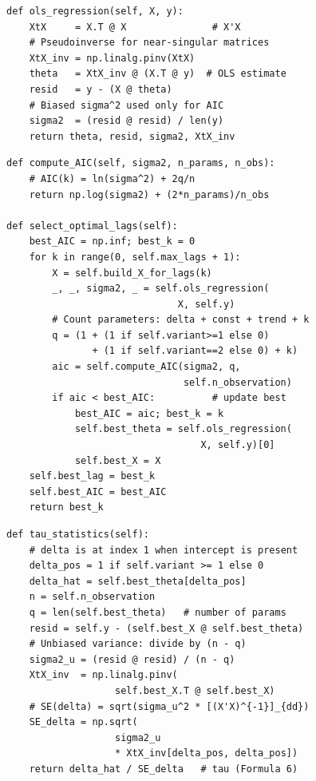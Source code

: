 \documentclass[10pt,a4paper,twocolumn]{article}
\begin{document}
\begin{tcolorbox}[codebox={Step 4 --- \texttt{ols\_regression()} (Formula 4)}]
\begin{lstlisting}[style=pythonplain]
def ols_regression(self, X, y):
    XtX     = X.T @ X               # X'X
    # Pseudoinverse for near-singular matrices
    XtX_inv = np.linalg.pinv(XtX)
    theta   = XtX_inv @ (X.T @ y)  # OLS estimate
    resid   = y - (X @ theta)
    # Biased sigma^2 used only for AIC
    sigma2  = (resid @ resid) / len(y)
    return theta, resid, sigma2, XtX_inv
\end{lstlisting}
\end{tcolorbox}

\begin{tcolorbox}[codebox={Step 5 --- AIC lag selection (Formula 5)}]
\begin{lstlisting}[style=pythonplain]
def compute_AIC(self, sigma2, n_params, n_obs):
    # AIC(k) = ln(sigma^2) + 2q/n
    return np.log(sigma2) + (2*n_params)/n_obs

def select_optimal_lags(self):
    best_AIC = np.inf; best_k = 0
    for k in range(0, self.max_lags + 1):
        X = self.build_X_for_lags(k)
        _, _, sigma2, _ = self.ols_regression(
                              X, self.y)
        # Count parameters: delta + const + trend + k
        q = (1 + (1 if self.variant>=1 else 0)
               + (1 if self.variant==2 else 0) + k)
        aic = self.compute_AIC(sigma2, q,
                               self.n_observation)
        if aic < best_AIC:          # update best
            best_AIC = aic; best_k = k
            self.best_theta = self.ols_regression(
                                  X, self.y)[0]
            self.best_X = X
    self.best_lag = best_k
    self.best_AIC = best_AIC
    return best_k
\end{lstlisting}
\end{tcolorbox}

\begin{tcolorbox}[codebox={Step 6 --- \texttt{tau\_statistics()} (Formulae 6)}]
\begin{lstlisting}[style=pythonplain]
def tau_statistics(self):
    # delta is at index 1 when intercept is present
    delta_pos = 1 if self.variant >= 1 else 0
    delta_hat = self.best_theta[delta_pos]
    n = self.n_observation
    q = len(self.best_theta)   # number of params
    resid = self.y - (self.best_X @ self.best_theta)
    # Unbiased variance: divide by (n - q)
    sigma2_u = (resid @ resid) / (n - q)
    XtX_inv  = np.linalg.pinv(
                   self.best_X.T @ self.best_X)
    # SE(delta) = sqrt(sigma_u^2 * [(X'X)^{-1}]_{dd})
    SE_delta = np.sqrt(
                   sigma2_u
                   * XtX_inv[delta_pos, delta_pos])
    return delta_hat / SE_delta   # tau (Formula 6)
\end{lstlisting}
\end{tcolorbox}
\end{document}
